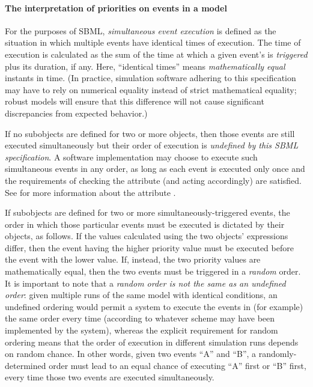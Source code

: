 

\paragraph{The interpretation of priorities on events in a model}

For the purposes of SBML, \emph{simultaneous event execution} is
defined as the situation in which multiple events have identical
times of execution.  The time of execution is calculated as the
sum of the time at which a given event's \Trigger is \emph{triggered}
plus its \Delay duration, if any.  Here, ``identical times'' means
\emph{mathematically equal} instants in time.  (In practice,
simulation software adhering to this specification may have to
rely on numerical equality instead of strict mathematical
equality; robust models will ensure that this difference will not
cause significant discrepancies from expected behavior.)

If no \Priority subobjects are defined for two or more \Event
objects, then those events are still executed simultaneously but
their order of execution is \emph{undefined by this SBML
  specification}.  A software implementation may choose to execute
such simultaneous events in any order, as long as each event is
executed only once and the requirements of checking the
 attribute (and acting accordingly) are
satisfied.  See  for more
information about the attribute .

If \Priority subobjects are defined for two or more
simultaneously-triggered events, the order in which those particular
events must be executed is dictated by their \Priority objects,
as follows.  If the values calculated using the two \Priority
objects'  expressions differ, then the event having
the higher priority value must be executed before the event with
the lower value.  If, instead, the two priority values are
mathematically equal, then the two events must be triggered in a
\emph{random} order.  It is important to note that a \emph{random
  order is not the same as an undefined order}: given multiple
runs of the same model with identical conditions, an undefined
ordering would permit a system to execute the events in (for
example) the same order every time (according to whatever scheme
may have been implemented by the system), whereas the explicit
requirement for random ordering means that the order of execution
in different simulation runs depends on random chance.  In other
words, given two events ``A'' and ``B'', a randomly-determined
order must lead to an equal chance of executing ``A'' first or
``B'' first, every time those two events are executed
simultaneously.

